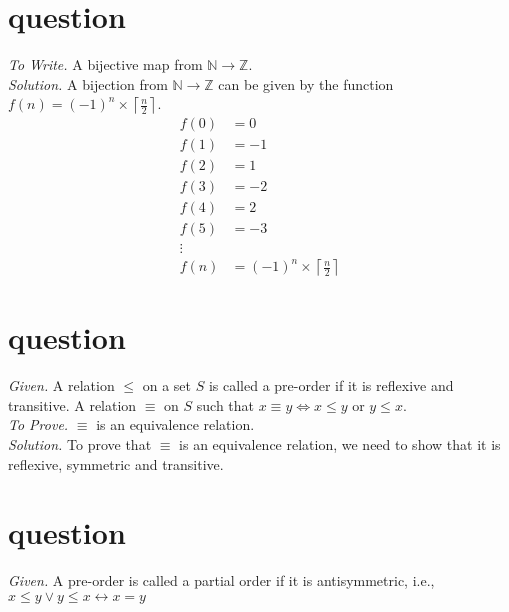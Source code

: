 \documentclass[11pt]{article}
\begin{document}
\section{question}
\emph{To Write. } A bijective map from $\mathbb{N} \rightarrow \mathbb{Z}$. \medskip \\
\emph{Solution. } A bijection from $\mathbb{N} \rightarrow \mathbb{Z}$ can be given by the function $f(n) = (-1)^n \times \left\lceil \frac{n}{2} \right\rceil$.
\begin{align*}
	f(0) & = 0                                                  \\
	f(1) & = -1                                                 \\
	f(2) & = 1                                                  \\
	f(3) & = -2                                                 \\
	f(4) & = 2                                                  \\
	f(5) & = -3                                                 \\
	\vdots                                                      \\
	f(n) & = (-1)^n \times \left\lceil \frac{n}{2} \right\rceil
\end{align*}










\section{question}
\emph{Given. } A relation $\leq$ on a set $S$ is called a pre-order if it is reflexive and transitive. A relation $\equiv$ on $S$ such that $x \equiv y \iff x \leq y$ or $y \leq x$. \medskip \\
\emph{To Prove. } $\equiv$ is an equivalence relation. \medskip \\
\emph{Solution. } To prove that $\equiv$ is an equivalence relation, we need to show that it is reflexive, symmetric and transitive. \medskip \\








\section{question}
\emph{Given. } A pre-order is called a partial order if it is antisymmetric, i.e., $x \leq y \lor y \leq x \leftrightarrow x = y$ \medskip \\
\end{document}
